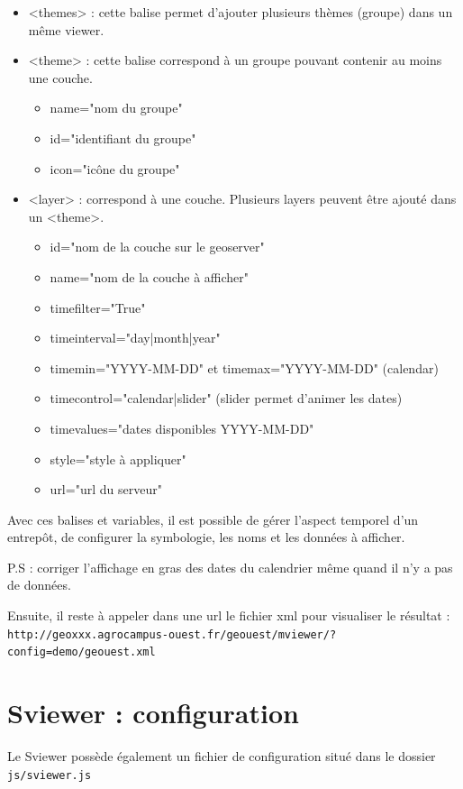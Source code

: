 \documentclass[10pt,a4paper]{article}
\begin{document}
\begin{itemize}
\item <themes> : cette balise permet d'ajouter plusieurs thèmes (groupe) dans un même viewer.
\item <theme> : cette balise correspond à un groupe pouvant contenir au moins une couche.
\begin{itemize}
\item name="nom du groupe"
\item id="identifiant du groupe"
\item icon="icône du groupe"
\end{itemize}
\item <layer> : correspond à une couche. Plusieurs layers peuvent être ajouté dans un <theme>.
\begin{itemize}
\item id="nom de la couche sur le geoserver"
\item name="nom de la couche à afficher"
\item timefilter="True"
\item timeinterval="day|month|year"
\item timemin="YYYY-MM-DD" et timemax="YYYY-MM-DD" (calendar)
\item timecontrol="calendar|slider" (slider permet d'animer les dates)
\item timevalues="dates disponibles YYYY-MM-DD"
\item style="style à appliquer"
\item url="url du serveur"
\end{itemize}
\end{itemize}

Avec ces balises et variables, il est possible de gérer l'aspect temporel d'un entrepôt, de configurer la symbologie, les noms et les données à afficher.

P.S : corriger l'affichage en gras des dates du calendrier même quand il n'y a pas de données.

Ensuite, il reste à appeler dans une url le fichier xml pour visualiser le résultat : \verb!http://geoxxx.agrocampus-ouest.fr/geouest/mviewer/?config=demo/geouest.xml!

\section{Sviewer : configuration}
Le Sviewer possède également un fichier de configuration situé dans le dossier \verb!js/sviewer.js!
\end{document}
